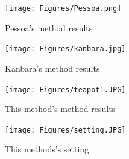 \begin{figure}[H]
    \centering
    \begin{minipage}{0.45\textwidth}
        \centering
        \texttt{[image: Figures/Pessoa.png]} %
        \caption{Pessoa's method results}
    \end{minipage}\hfill
    \begin{minipage}{0.45\textwidth}
        \centering
        \texttt{[image: Figures/kanbara.jpg]} %
        \caption{Kanbara's method results}
    \end{minipage}\hfill
    \begin{minipage}{0.45\textwidth}
        \centering
        \texttt{[image: Figures/teapot1.JPG]} %
        \caption{This method's method results}
    \end{minipage}\hfill
    \begin{minipage}{0.45\textwidth}
        \centering
        \texttt{[image: Figures/setting.JPG]} %
        \caption{This methods's setting}
    \end{minipage}
\end{figure}